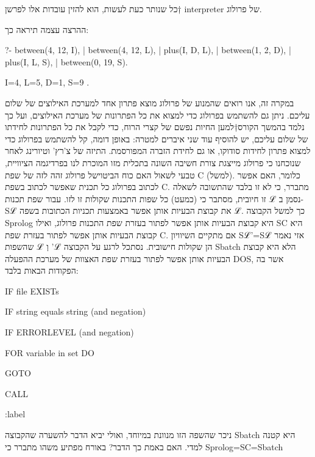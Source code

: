      כל שנותר כעת לעשות, הוא להזין עובדות אלו לפרשן†{ interpreter} של פרולוג.

      ההרצה עצמה תיראה כך:

      ?- between(4, 12, I),
      | between(4, 12, L),
      | plus(I, D, L),
      | between(1, 2, D),
      | plus(I, L, S),
      | between(0, 19, S).

      I=4,
      L=5,
      D=1,
      S=9 .

      במקרה זה, אנו רואים שהמנוע של פרולוג מוצא פתרון אחד למערכת האילוצים של
      שלום עליכם. ניתן גם להשתמש בפרולוג כדי למצוא את כל הפתרונות של מערכת
      האילוצים, ועל
      כך נלמד בהמשך הקורס†{למען החיות נפשם של קצרי הרוח, כדי לקבל את כל הפתרונות לחידתו של שלום עליכם, יש להוסיף עוד שני איברים למטרה:}
      באופן דומה, קל להשתמש בפרולוג כדי למצוא
      פתרון לחידות סודוקו, או גם לחידת הזברה המפורסמת. התיזה של צ'רץ' וטיורינג
      לאחר שנוכחנו כי פרולוג מייצגת צורת חשיבה השונה בתכלית מזו המוכרת לנו
      בפרדיגמה הציוויית, טבעי לשאול האם כוח הביטוישל פרולוג זהה לזה של שפת C
      (למשל). כלומר,
      האם אפשר לכתוב בפרולוג כל תכנית שאפשר לכתוב בשפת C. מתברר, כי לא זו בלבד
      שהתשובה לשאלה זו חיובית, מסתבר כי (כמעט) כל שפות התכנות שקולות זו לזו. עבור
      שפת תכנות ℒ נסמן ב-Sℒ את קבוצת הבעיות אותן אפשר באמצעות תכניות הכתובות
      בשפה ℒ. כך למשל הקבוצה Sprolog היא קבוצת הבעיות אותן אפשר לפתור בעזרת שפת
      התכנות פרולוג, ואילו SC היא קבוצת הבעיות אותן אפשר לפתור בעזרת שפת C. אם
      מתקיים השיוויון Sℒ'=Sℒ אזי נאמר שהשפות ℒ וְ 'ℒ הן שקולות חישובית.
      נסתכל לרגע על הקבוצה Sbatch הלא היא קבוצת הבעיות אותן אפשר לפתור בעזרת שפת האצוות של מערכת ההפעלה DOS, אשר בה הפקודות הבאות בלבד:
      \begin{ציינון}
\item IF file EXISTs
\item IF string equals string (and negation)
\item IF ERRORLEVEL (and negation)
\item FOR variable in set DO
\item GOTO
\item CALL
\item :label
    \end{ציינון}
      ניכר שהשפה הזו מנוונת במיוחד, ואולי יביא הדבר להשערה שהקבוצה Sbatch היא
      קטנה למדי. האם באמת כך הדבר? באורח מפתיע משהו מתברר כי
      Sprolog=SC=Sbatch

